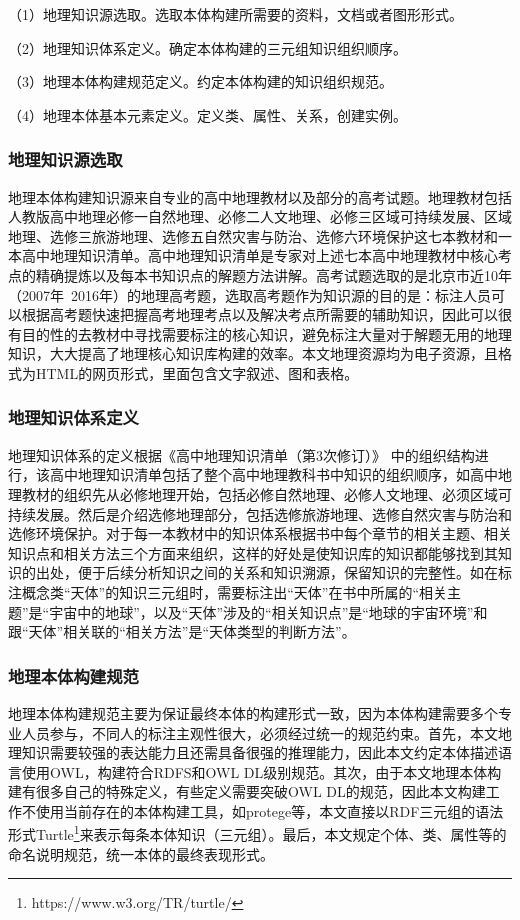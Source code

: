 （1）地理知识源选取。选取本体构建所需要的资料，文档或者图形形式。

（2）地理知识体系定义。确定本体构建的三元组知识组织顺序。

（3）地理本体构建规范定义。约定本体构建的知识组织规范。

（4）地理本体基本元素定义。定义类、属性、关系，创建实例。

\subsubsection{地理知识源选取}
地理本体构建知识源来自专业的高中地理教材以及部分的高考试题。地理教材包括人教版高中地理必修一自然地理、必修二人文地理、必修三区域可持续发展、区域地理、选修三旅游地理、选修五自然灾害与防治、选修六环境保护这七本教材和一本高中地理知识清单。高中地理知识清单是专家对上述七本高中地理教材中核心考点的精确提炼以及每本书知识点的解题方法讲解。高考试题选取的是北京市近10年（2007年~2016年）的地理高考题，选取高考题作为知识源的目的是：标注人员可以根据高考题快速把握高考地理考点以及解决考点所需要的辅助知识，因此可以很有目的性的去教材中寻找需要标注的核心知识，避免标注大量对于解题无用的地理知识，大大提高了地理核心知识库构建的效率。本文地理资源均为电子资源，且格式为HTML的网页形式，里面包含文字叙述、图和表格。

\subsubsection{地理知识体系定义}
地理知识体系的定义根据《高中地理知识清单（第3次修订）》
中的组织结构进行，该高中地理知识清单包括了整个高中地理教科书中知识的组织顺序，如高中地理教材的组织先从必修地理开始，包括必修自然地理、必修人文地理、必须区域可持续发展。然后是介绍选修地理部分，包括选修旅游地理、选修自然灾害与防治和选修环境保护。对于每一本教材中的知识体系根据书中每个章节的相关主题、相关知识点和相关方法三个方面来组织，这样的好处是使知识库的知识都能够找到其知识的出处，便于后续分析知识之间的关系和知识溯源，保留知识的完整性。如在标注概念类“天体”的知识三元组时，需要标注出“天体”在书中所属的“相关主题”是“宇宙中的地球”，以及“天体”涉及的“相关知识点”是“地球的宇宙环境”和跟“天体”相关联的“相关方法”是“天体类型的判断方法”。

\subsubsection{地理本体构建规范}
地理本体构建规范主要为保证最终本体的构建形式一致，因为本体构建需要多个专业人员参与，不同人的标注主观性很大，必须经过统一的规范约束。首先，本文地理知识需要较强的表达能力且还需具备很强的推理能力，因此本文约定本体描述语言使用OWL，构建符合RDFS和OWL DL级别规范。其次，由于本文地理本体构建有很多自己的特殊定义，有些定义需要突破OWL DL的规范，因此本文构建工作不使用当前存在的本体构建工具，如protege等，本文直接以RDF三元组的语法形式Turtle\footnote{https://www.w3.org/TR/turtle/}来表示每条本体知识（三元组）。最后，本文规定个体、类、属性等的命名说明规范，统一本体的最终表现形式。

